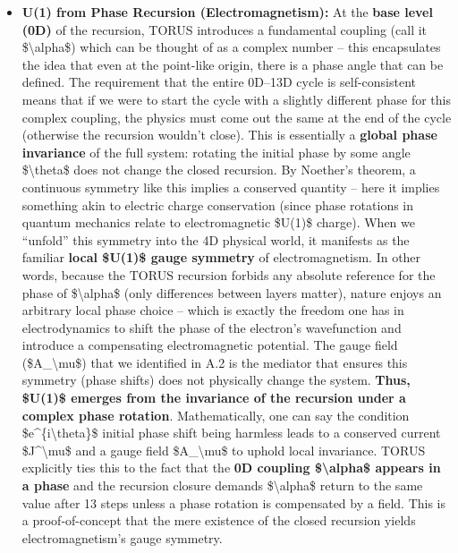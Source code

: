 \begin{itemize}
\item
  \textbf{U(1) from Phase Recursion (Electromagnetism):} At the
  \textbf{base level (0D)} of the recursion, TORUS introduces a
  fundamental coupling (call it \$\textbackslash{}alpha\$) which can be
  thought of as a complex number -- this encapsulates the idea that even
  at the point-like origin, there is a phase angle that can be defined.
  The requirement that the entire 0D--13D cycle is self-consistent means
  that if we were to start the cycle with a slightly different phase for
  this complex coupling, the physics must come out the same at the end
  of the cycle (otherwise the recursion wouldn't close)​. This is
  essentially a \textbf{global phase invariance} of the full system:
  rotating the initial phase by some angle \$\textbackslash{}theta\$
  does not change the closed recursion. By Noether's theorem, a
  continuous symmetry like this implies a conserved quantity -- here it
  implies something akin to electric charge conservation (since phase
  rotations in quantum mechanics relate to electromagnetic \$U(1)\$
  charge). When we ``unfold'' this symmetry into the 4D physical world,
  it manifests as the familiar \textbf{local \$U(1)\$ gauge symmetry} of
  electromagnetism​. In other words, because the TORUS recursion forbids
  any absolute reference for the phase of \$\textbackslash{}alpha\$
  (only differences between layers matter), nature enjoys an arbitrary
  local phase choice -- which is exactly the freedom one has in
  electrodynamics to shift the phase of the electron's wavefunction and
  introduce a compensating electromagnetic potential. The gauge field
  (\$A\_\textbackslash{}mu\$) that we identified in A.2 is the mediator
  that ensures this symmetry (phase shifts) does not physically change
  the system. \textbf{Thus, \$U(1)\$ emerges from the invariance of the
  recursion under a complex phase rotation}. Mathematically, one can say
  the condition \$e\^{}\{i\textbackslash{}theta\}\$ initial phase shift
  being harmless leads to a conserved current
  \$J\^{}\textbackslash{}mu\$ and a gauge field
  \$A\_\textbackslash{}mu\$ to uphold local invariance. TORUS explicitly
  ties this to the fact that the \textbf{0D coupling
  \$\textbackslash{}alpha\$ appears in a phase} and the recursion
  closure demands \$\textbackslash{}alpha\$ return to the same value
  after 13 steps unless a phase rotation is compensated by a field​.
  This is a proof-of-concept that the mere existence of the closed
  recursion yields electromagnetism's gauge symmetry.

\end{itemize}
